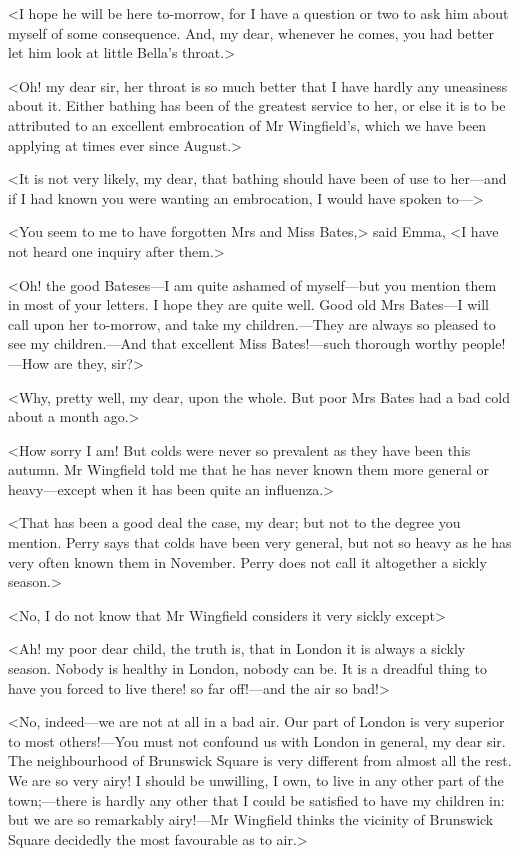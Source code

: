 <I hope he will be here to-morrow, for I have a question or two to ask him about myself of some consequence. And, my dear, whenever he comes, you had better let him look at little Bella's throat.>

<Oh! my dear sir, her throat is so much better that I have hardly any uneasiness about it. Either bathing has been of the greatest service to her, or else it is to be attributed to an excellent embrocation of Mr Wingfield's, which we have been applying at times ever since August.>

<It is not very likely, my dear, that bathing should have been of use to her—and if I had known you were wanting an embrocation, I would have spoken to—>

<You seem to me to have forgotten Mrs and Miss Bates,> said Emma, <I have not heard one inquiry after them.>

<Oh! the good Bateses—I am quite ashamed of myself—but you mention them in most of your letters. I hope they are quite well. Good old Mrs Bates—I will call upon her to-morrow, and take my children.—They are always so pleased to see my children.—And that excellent Miss Bates!—such thorough worthy people!—How are they, sir?>

<Why, pretty well, my dear, upon the whole. But poor Mrs Bates had a bad cold about a month ago.>

<How sorry I am! But colds were never so prevalent as they have been this autumn. Mr Wingfield told me that he has never known them more general or heavy—except when it has been quite an influenza.>

<That has been a good deal the case, my dear; but not to the degree you mention. Perry says that colds have been very general, but not so heavy as he has very often known them in November. Perry does not call it altogether a sickly season.>

<No, I do not know that Mr Wingfield considers it very sickly except\longdash>

<Ah! my poor dear child, the truth is, that in London it is always a sickly season. Nobody is healthy in London, nobody can be. It is a dreadful thing to have you forced to live there! so far off!—and the air so bad!>

<No, indeed—we are not at all in a bad air. Our part of London is very superior to most others!—You must not confound us with London in general, my dear sir. The neighbourhood of Brunswick Square is very different from almost all the rest. We are so very airy! I should be unwilling, I own, to live in any other part of the town;—there is hardly any other that I could be satisfied to have my children in: but we are so remarkably airy!—Mr Wingfield thinks the vicinity of Brunswick Square decidedly the most favourable as to air.>

